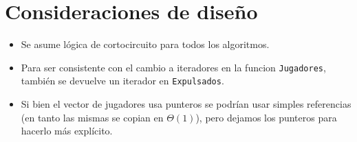 \section{Consideraciones de diseño}

\begin{itemize}
	\item Se asume lógica de cortocircuito para todos los algoritmos.

	\item Para ser consistente con el cambio a iteradores en la funcion \texttt{Jugadores}, también se devuelve un iterador en \texttt{Expulsados}.

	\item Si bien el vector de jugadores usa punteros se podrían usar simples referencias (en tanto las mismas se copian en $\Theta(1)$), pero dejamos los punteros para hacerlo más explícito.

\end{itemize}